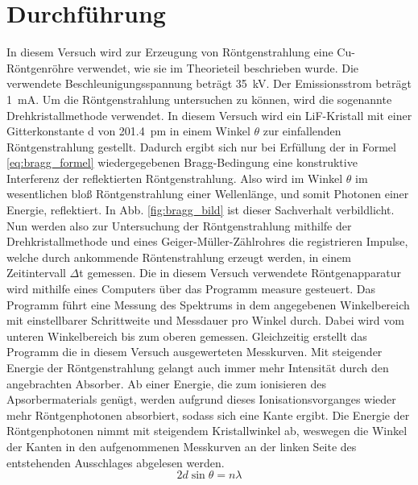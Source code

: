 
\section{Durchführung}
%
In diesem Versuch wird zur Erzeugung von Röntgenstrahlung eine Cu-Röntgenröhre verwendet, wie sie im Theorieteil beschrieben wurde. Die verwendete Beschleunigungsspannung beträgt \SI{35}{\kilo\volt}. Der Emissionsstrom beträgt \SI{1}{\milli\ampere}.
Um die Röntgenstrahlung untersuchen zu können, wird die sogenannte Drehkristallmethode verwendet. In diesem Versuch wird ein LiF-Kristall mit einer Gitterkonstante d von \SI{201.4}{\pico\metre} in einem Winkel $\theta$ zur einfallenden Röntgenstrahlung gestellt. Dadurch ergibt sich nur bei Erfüllung der in Formel \eqref{eq:bragg_formel} wiedergegebenen Bragg-Bedingung eine konstruktive Interferenz der reflektierten Röntgenstrahlung. Also wird im Winkel $\theta$ im wesentlichen bloß Röntgenstrahlung einer Wellenlänge, und somit Photonen einer Energie, reflektiert. In Abb. \ref{fig:bragg_bild} ist dieser Sachverhalt verbildlicht.
Nun werden also zur Untersuchung der Röntgenstrahlung mithilfe der Drehkristallmethode und eines Geiger-Müller-Zählrohres die registrieren Impulse, welche durch ankommende Röntenstrahlung erzeugt werden, in einem Zeitintervall $\Delta$t gemessen.
Die in diesem Versuch verwendete Röntgenapparatur wird mithilfe eines Computers über das Programm measure gesteuert. Das Programm führt eine Messung des Spektrums in dem angegebenen Winkelbereich mit einstellbarer Schrittweite und Messdauer pro Winkel durch. Dabei wird vom unteren Winkelbereich bis zum oberen gemessen. Gleichzeitig erstellt das Programm die in diesem Versuch ausgewerteten Messkurven. Mit steigender Energie der Röntgenstrahlung gelangt auch immer mehr Intensität durch den angebrachten Absorber. Ab einer Energie, die zum ionisieren des Apsorbermaterials genügt, werden aufgrund dieses Ionisationsvorganges wieder mehr Röntgenphotonen absorbiert, sodass sich eine Kante ergibt. Die Energie der Röntgenphotonen nimmt mit steigendem Kristallwinkel ab, weswegen die Winkel der Kanten in den aufgenommenen Messkurven an der linken Seite des entstehenden Ausschlages abgelesen werden. 
%
\begin{equation}
2 d \sin{\theta} = n \lambda
\label{eq:bragg_formel}
\end{equation}
